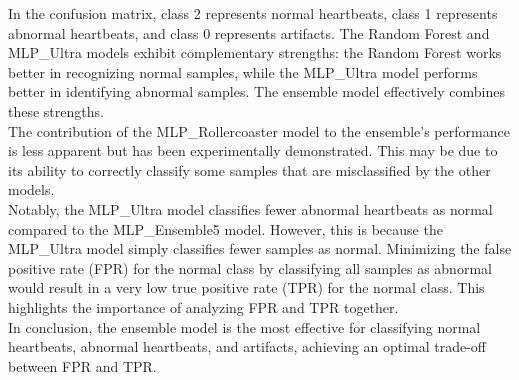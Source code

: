 \noindent
In the confusion matrix, class 2 represents normal heartbeats, class 1 represents abnormal heartbeats, and 
class 0 represents artifacts. The Random Forest and MLP\_Ultra models exhibit complementary strengths: the 
Random Forest works better in recognizing normal samples, while the MLP\_Ultra model performs better in 
identifying abnormal samples. The ensemble model effectively combines these strengths.\\\noindent
The contribution of the MLP\_Rollercoaster model to the ensemble’s performance is less apparent but has been 
experimentally demonstrated. This may be due to its ability to correctly classify some samples that are 
misclassified by the other models.\\\noindent
Notably, the MLP\_Ultra model classifies fewer abnormal heartbeats as normal compared to the MLP\_Ensemble5 
model. However, this is because the MLP\_Ultra model simply classifies fewer samples as normal. Minimizing 
the false positive rate (FPR) for the normal class by classifying all samples as abnormal would result in a very 
low true positive rate (TPR) for the normal class. This highlights the importance of analyzing FPR and TPR together.\\\noindent
In conclusion, the ensemble model is the most effective for classifying normal heartbeats, abnormal heartbeats, 
and artifacts, achieving an optimal trade-off between FPR and TPR.